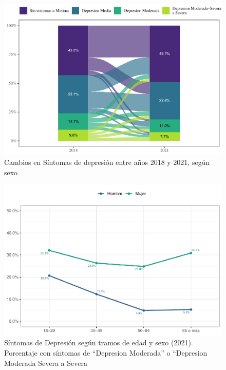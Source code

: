 \documentclass[
  12pt,
  openany]{book}
\begin{document}
\begin{figure}

{\centering \includegraphics{reporte-elsoc_files/figure-latex/depre-sexo-1} 

}

\caption{Cambios en Síntomas de depresión entre años 2018 y 2021, según sexo}\label{fig:depre-sexo}
\end{figure}

\begin{figure}

{\centering \includegraphics{reporte-elsoc_files/figure-latex/depre-edad-sexo-1} 

}

\caption{Síntomas de Depresión según tramos de edad y sexo (2021). Porcentaje con síntomas de “Depresion Moderada” o “Depresion Moderada Severa a Severa}\label{fig:depre-edad-sexo}
\end{figure}
\end{document}
